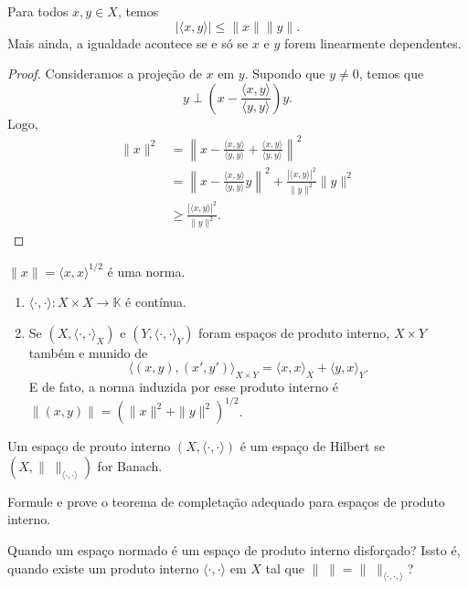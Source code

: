 \documentclass[portuguese]{article}
\theoremstyle{definition}
\begin{document}
\begin{prop}
	Para todos $x,y\in X$, temos
	\[|\langle x,y\rangle|\leq\|x\|\|y\|.\]
	Mais ainda, a igualdade acontece se e só se $x$ e $y$ forem linearmente dependentes.
\end{prop}
\begin{proof}
	Consideramos a projeção de $x$ em $y$. Supondo que $y\neq0$, temos que
	\[y\perp \left(x-\frac{\langle x,y\rangle}{\langle y,y\rangle}\right)y.\]
	Logo,
	\begin{align*}
		\|x\|^2&=\left\|x-\frac{\langle x,y\rangle}{\langle y,y\rangle}+\frac{\langle x,y\rangle}{\langle y,y\rangle}\right\|^2\\
		&=\left\|x-\frac{\langle x,y\rangle}{\langle y,y\rangle}y\right\|^2+\frac{|\langle x,y\rangle|^2}{\|y\|^2}\|y\|^2\\
		&\geq\frac{|\langle x,y\rangle|^2}{\|y\|^2}.
	\end{align*}
\end{proof}
\begin{coro}
	$\|x\|=\langle x,x\rangle^{1/2}$ é uma norma.
\end{coro}
\begin{obs}\leavevmode
	\begin{enumerate}
		\item $\langle\cdot,\cdot\rangle:X\times X\to\mathbb{K}$ é contínua.
		\item Se $(X,\langle\cdot,\cdot\rangle_X)$ e $(Y,\langle\cdot,\cdot\rangle_Y)$ foram espaços de produto interno, $X\times Y$ também e munido de
		\[\langle(x,y),(x',y')\rangle_{X\times Y}=\langle x,x\rangle_X+\langle y,x\rangle_Y.\]
		E de fato, a norma induzida por esse produto interno é $\|(x,y)\|=\left(\|x\|^2+\|y\|^2\right)^{1/2}$.
	\end{enumerate}
\end{obs}
\begin{defn}
	Um espaço de prouto interno $(X,\langle\cdot,\cdot\rangle)$ é um espaço de Hilbert se $(X,\|\;\|_{\langle\cdot,\cdot\rangle})$ for Banach.
\end{defn}
\begin{exer}
	Formule e prove o teorema de completação adequado para espaços de produto interno.
\end{exer}
\begin{pregunta}
	Quando um espaço normado é um espaço de produto interno disforçado? Issto é, quando existe um produto interno $\langle\cdot,\cdot\rangle$ em $X$ tal que $\|\;\|=\|\;\|_{\langle\cdot,\cdot,\rangle}$?
\end{pregunta}
\end{document}
